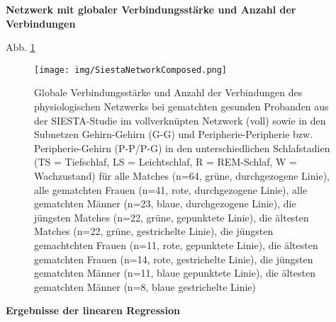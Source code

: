 \textbf{Netzwerk mit globaler Verbindungsstärke und Anzahl der Verbindungen}


Abb. \ref{fig:SiestaNetworkComposed}







\begin{figure}[H]
	\centering
	\texttt{[image: img/SiestaNetworkComposed.png]}
	\caption[Globale Verbindungsstärke und Anzahl der Verbindungen des physiologischen Netzwerks bei gematchten gesunden Probanden]{Globale Verbindungsstärke und Anzahl der Verbindungen des physiologischen Netzwerks bei gematchten gesunden Probanden aus der SIESTA-Studie im vollverknüpten Netzwerk (voll) sowie in den Subnetzen Gehirn-Gehirn (G-G) und Peripherie-Peripherie bzw. Peripherie-Gehirn (P-P/P-G) in den unterschiedlichen Schlafstadien (TS = Tiefschlaf, LS = Leichtschlaf, R = \acs{REM}-Schlaf, W = Wachzustand) für
alle Matches (n=64, grüne, durchgezogene Linie), alle gematchten Frauen (n=41, rote, durchgezogene Linie), alle gematchten Männer (n=23, blaue, durchgezogene Linie), die jüngsten Matches (n=22, grüne, gepunktete Linie), die ältesten Matches (n=22, grüne, gestrichelte Linie), die jüngsten gemachtchten Frauen (n=11, rote, gepunktete Linie), die ältesten gematchten Frauen (n=14, rote, gestrichelte Linie), die jüngsten gematchten Männer (n=11, blaue gepunktete Linie), die ältesten gematchten Männer (n=8, blaue gestrichelte Linie)}
	\label{fig:SiestaNetworkComposed}
\end{figure}






\textbf{Ergebnisse der linearen Regression}

